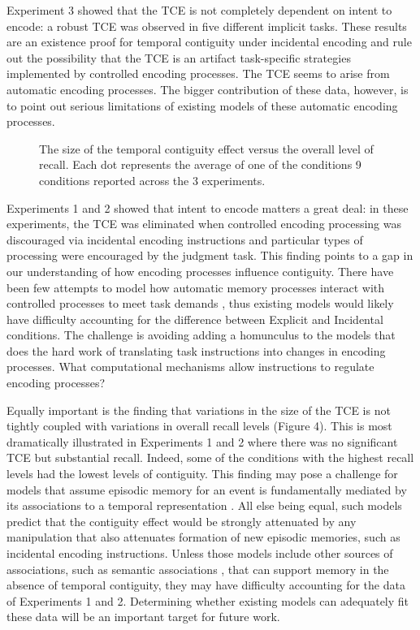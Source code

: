 \documentclass[jou,natbib,floatsintext]{apa6} %
\begin{document}
Experiment 3 showed that the TCE is not completely dependent on intent to encode: a robust TCE was observed in five different implicit tasks. These results are an existence proof for temporal contiguity under incidental encoding and rule out the possibility that the TCE is an artifact task-specific strategies implemented by controlled encoding processes. The TCE seems to arise from automatic encoding processes. The bigger contribution of these data, however, is to point out serious limitations of existing models of these automatic encoding processes. 


\begin{figure}%
\caption{The size of the temporal contiguity effect versus the overall level of recall. Each dot represents the average of one of the conditions 9 conditions reported across the 3 experiments.}
\label{door}
\end{figure}

Experiments 1 and 2 showed that intent to encode matters a great deal: in these experiments, the TCE was eliminated when controlled encoding processing was discouraged via incidental encoding instructions and particular types of processing were encouraged by the judgment task. This finding points to a gap in our understanding of how encoding processes influence contiguity. There have been few attempts to model how automatic memory processes interact with controlled processes to meet task demands \citep{LehmMalm13,PolyEtal09}, thus existing models would likely have difficulty accounting for the difference between Explicit and Incidental conditions. The challenge is avoiding adding a homunculus to the models that does the hard work of translating task instructions into changes in encoding processes. What computational mechanisms allow instructions to regulate encoding processes?

Equally important is the finding that variations in the size of the TCE is not tightly coupled with variations in overall recall levels (Figure 4). This is most dramatically illustrated in Experiments 1 and 2 where there was no significant TCE but substantial recall. Indeed, some of the conditions with the highest recall levels had the lowest levels of contiguity. This finding may pose a challenge for models that assume episodic memory for an event is fundamentally mediated by its associations to a temporal representation \citep[e.g.,][]{LohnEtal14,HealKaha15}. All else being equal, such models predict that the contiguity effect would be strongly attenuated by any manipulation that also attenuates formation of new episodic memories, such as incidental encoding instructions. Unless those models include other sources of associations, such as semantic associations \citep{PolyEtal09}, that can support memory in the absence of temporal contiguity, they may have difficulty accounting for the data of Experiments 1 and 2. Determining whether existing models can adequately fit these data will be an important target for future work.
\end{document}
